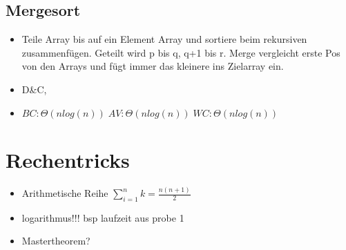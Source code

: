 \documentclass{article}
\begin{document}
\subsection{Mergesort}
\begin{itemize}
\item Teile Array bis auf ein Element Array und sortiere beim rekursiven zusammenfügen. Geteilt wird p bis q, q+1 bis r. \newline
Merge vergleicht erste Pos von den Arrays und fügt immer das kleinere ins Zielarray ein.
\item D\&C, 
\item $BC: \Theta(nlog(n))\; AV:\Theta(nlog(n))\; WC: \Theta(nlog(n))\;$
\end{itemize}















\section{Rechentricks}
\begin{itemize}
\item Arithmetische Reihe $\sum_{i=1}^n k  = \frac{n(n+1)}{2} $
\item logarithmus!!! bsp laufzeit aus probe 1
\item Mastertheorem?
\end{itemize}
\end{document}
